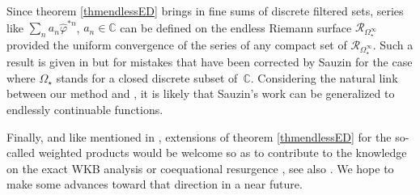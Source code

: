 \documentclass[11pt, english]{smfart}
\theoremstyle{definition}
\begin{document}
Since theorem  \ref{thmendlessED} brings in fine sums of discrete
filtered sets, series like $\sum_{n} a_n \widehat{\varphi}^{\ast n}$,
$a_n \in \mathbb{C}$ can be defined on the endless Riemann surface
$\mathscr{R}_{\Omega_\star^\infty}$  provided the uniform
convergence of the series
of any compact set of $\mathscr{R}_{\Omega_\star^\infty}$. Such a result is given in
\cite{CNP1} but for mistakes that have been corrected by Sauzin 
\cite{Sau013-3} for the case where $\Omega_\star$ stands for a closed
discrete subset of~$\mathbb{C}$. Considering the natural link between our
method and \cite{Sau013-3}, it is likely that Sauzin's
work can be generalized to endlessly continuable functions.

Finally, and like  mentioned in \cite{OU012, Sau013-3}, extensions of
theorem  \ref{thmendlessED} for the so-called weighted products
\cite{Ec93-1, Ec94} would be welcome so as to contribute to the knowledge on
the exact WKB analysis or coequational resurgence \cite{Ec84, DDP93,
  DDP97, DP99, Kawai-96, Kawai-004}, see also \cite{GdGvS014}. 
We hope to make some advances toward that direction in
a near future.

\backmatter
\end{document}
